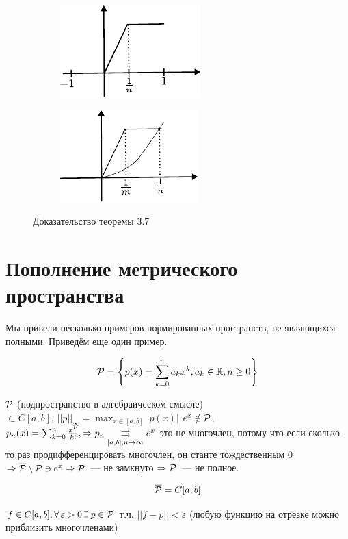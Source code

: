 \documentclass[document]{subfiles}
\begin{document}
\begin{figure}
    \begin{subfigure}{0.40\textwidth}
        \includegraphics*{images/chapter3/incompleteness_cab_1.pdf}
    \end{subfigure}
    \begin{subfigure}{0.40\textwidth}
        \includegraphics*{images/chapter3/incompleteness_cab_2.pdf}
    \end{subfigure}
    \caption{Доказательство теоремы 3.7}
\end{figure}

\section{Пополнение метрического пространства}

Мы привели несколько примеров нормированных пространств, не являющихся полными. Приведём еще один пример.
\begin{definition}
    \[ \mathcal{P} = \left\{ p(x) = \sum^n_{k=0}a_k x^k, a_k \in \mathbb{R}, n \geq 0 \right\} \]
\end{definition}
$\mathcal{P}$ (подпространство в алгебраическом смысле) $ \subset C[a,b], \, ||p||_\infty = \max_{x \in [a,b]} |p(x)|$
$e^x \notin \mathcal{P}$, $p_n(x) = \sum^n_{k=0} \frac{x^k}{k!}, \Rightarrow p_n \underset{[a,b], n \to \infty}{\rightrightarrows} e^x$
это не многочлен, потому что если сколько-то раз продифференцировать многочлен, он станте тождественным 0
$\Rightarrow \overline{\mathcal{P}} \setminus \mathcal{P} \ni e^x \Rightarrow \mathcal{P}$~--- не замкнуто $\Rightarrow \mathcal{P}$~--- не полное.

\[ \overline{\mathcal{P}} = C[a,b] \]
\begin{theorem}[Вейерштрасса, 1885]
    $f \in C[a,b], \forall \varepsilon > 0 \, \exists p \in \Rho$ т.ч.  $||f - p|| < \varepsilon$
    (любую функцию на отрезке можно приблизить многочленами)
\end{theorem}
\end{document}
